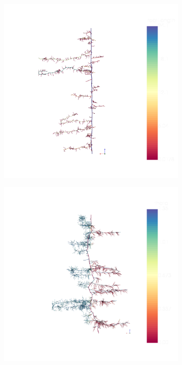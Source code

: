 \begin{figure}
\begin{subfigure}[c]{0.3\textwidth}
\includegraphics[width=0.99\textwidth]{example5a.png}
 \label{fig:elongation}
\end{subfigure}
\begin{subfigure}[c]{0.3\textwidth}
\includegraphics[width=0.99\textwidth]{example5c.png}

\end{subfigure}
\end{figure}
